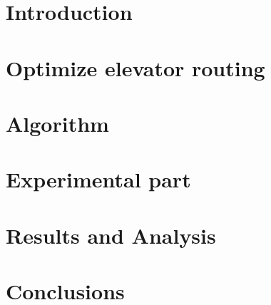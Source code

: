\documentclass{scrartcl}
\title{\reportname}
\subtitle{An Evolutionary Algorithm for an elevator to deliver as many people as possible to their desired floor}
\author{Oskar Sundberg \and Linus Savinainen \and Samuel Wallander Leyonberg \and Gustav Pråmell \and Joel Scarinius Stävmo}
\date{\today}
\begin{document}
\maketitle

\newpage

\tableofcontents

\newpage

\section{Introduction}
\label{sec:intro}


\newpage

\section{Optimize elevator routing}
\label{sec:problem_description}


\newpage

\section{Algorithm}
\label{sec:algorithm}


\newpage

\section{Experimental part}
\label{sec:experimentation}


\newpage

\section{Results and Analysis}
\label{sec:results-analysis}


\newpage

\section{Conclusions}
\label{sec:conclusions}


\newpage



\end{document}
